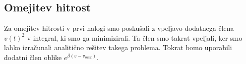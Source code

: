 \documentclass[slovene,11pt,a4paper]{article}
\numberwithin{equation}{section} %
\numberwithin{figure}{section} %
\numberwithin{table}{section} %
\begin{document}
\pagebreak


\subsection{Omejitev hitrost}
Za omejitev hitrosti v prvi nalogi smo poskušali z vpeljavo dodatnega člena $v(t)^2$ v integral, ki smo ga minimizirali. Ta člen smo takrat vpeljali, ker smo lahko izračunali analitično rešitev takega problema. Tokrat bomo uporabili dodatni člen oblike $e^{\beta (v-v_{max})}$.


\begin{figure}[h]
\noindent\makebox[\textwidth][l]{%
\hspace{-\dimexpr\oddsidemargin+1in}%

\begin{minipage}[t]{0.5\paperwidth}
\begin{flushleft}


\end{flushleft}
\end{minipage}}
\end{figure}
\end{document}

